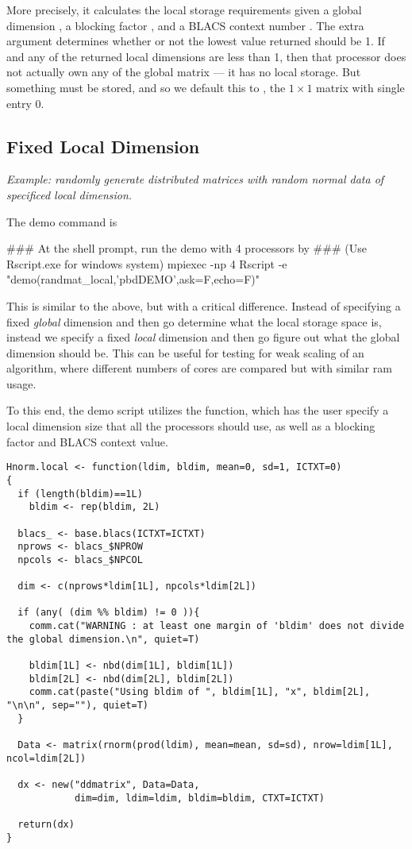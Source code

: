 More precisely, it calculates the local storage requirements given a global dimension , a blocking factor , and a BLACS context number .  The extra argument  determines whether or not the lowest value returned should be 1.  If  and any of the returned local dimensions are less than 1, then that processor does not actually own any of the global matrix --- it has no local storage.  But something must be stored, and so we default this to , the $1\times 1$ matrix with single entry 0.


\subsection{Fixed Local Dimension}

\emph{Example:  randomly generate distributed matrices with random normal data of specificed local dimension.}

The demo command is
\begin{Command}
### At the shell prompt, run the demo with 4 processors by
### (Use Rscript.exe for windows system)
mpiexec -np 4 Rscript -e "demo(randmat_local,'pbdDEMO',ask=F,echo=F)"
\end{Command}

This is similar to the above, but with a critical difference.  Instead of specifying a fixed \emph{global} dimension and then go determine what the local storage space is, instead we specify a fixed \emph{local} dimension and then go figure out what the global dimension should be.  This can be useful for testing for weak scaling of an algorithm, where different numbers of cores are compared but with similar ram usage.

To this end, the demo script utilizes the  function, which has the user specify a local dimension size that all the processors should use, as well as a blocking factor and BLACS context value.  

\begin{lstlisting}[language=rr,title=Hnorm.local()]
Hnorm.local <- function(ldim, bldim, mean=0, sd=1, ICTXT=0)
{
  if (length(bldim)==1L)
    bldim <- rep(bldim, 2L)
  
  blacs_ <- base.blacs(ICTXT=ICTXT)
  nprows <- blacs_$NPROW
  npcols <- blacs_$NPCOL
  
  dim <- c(nprows*ldim[1L], npcols*ldim[2L])
  
  if (any( (dim %% bldim) != 0 )){
    comm.cat("WARNING : at least one margin of 'bldim' does not divide the global dimension.\n", quiet=T)
    
    bldim[1L] <- nbd(dim[1L], bldim[1L])
    bldim[2L] <- nbd(dim[2L], bldim[2L])
    comm.cat(paste("Using bldim of ", bldim[1L], "x", bldim[2L], "\n\n", sep=""), quiet=T)
  }
  
  Data <- matrix(rnorm(prod(ldim), mean=mean, sd=sd), nrow=ldim[1L], ncol=ldim[2L])
  
  dx <- new("ddmatrix", Data=Data,
            dim=dim, ldim=ldim, bldim=bldim, CTXT=ICTXT)
  
  return(dx)
}
\end{lstlisting}

